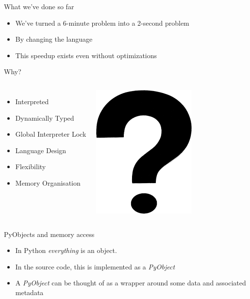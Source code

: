 \documentclass[12pt, aspectration=169]{beamer}
\begin{document}
    \begin{frame}{What we've done so far}
        \begin{itemize}
            \item We've turned a 6-minute problem into a 2-second problem
            \item By changing the language
            \item This speedup exists even without optimizations
        \end{itemize}
    \end{frame}

    \begin{frame}{Why?}
        \begin{center}
            \begin{columns}
                \begin{itemize}
                    \item Interpreted
                    \item Dynamically Typed
                    \item Global Interpreter Lock
                    \item Language Design
                    \item Flexibility
                    \item Memory Organisation
                \end{itemize}
                \includegraphics[scale=0.45]{static/images/big_question_mark}
            \end{columns}
        \end{center}
    \end{frame}

    \begin{frame}{PyObjects and memory access}
        \begin{itemize}
            \item In Python \textit{everything} is an object.
            \item In the source code, this is implemented as a \textit{PyObject}
            \item A \textit{PyObject} can be thought of as a wrapper around some data and associated metadata
        \end{itemize}
    \end{frame}
\end{document}
